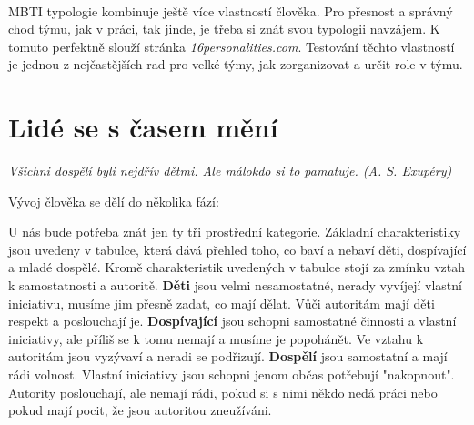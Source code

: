 \documentclass[a4paper,12pt]{report}
\begin{document}
\

MBTI typologie kombinuje ještě více vlastností člověka. Pro přesnost a správný chod týmu, jak v práci, tak jinde, je třeba si znát svou typologii navzájem. K tomuto perfektně slouží stránka \textit{16personalities.com}. Testování těchto vlastností je jednou z nejčastějších rad pro velké týmy, jak zorganizovat a určit role v týmu.

\section[Lidé se s časem mění]{Lidé se s časem mění}
\pagelogos
\textit{Všichni dospělí byli nejdřív dětmi. Ale málokdo si to pamatuje. (A. S. Exupéry)}

\begin{samepage}
Vývoj člověka se dělí do několika fází:
\end{samepage}

U nás bude potřeba znát jen ty tři prostřední kategorie. Základní charakteristiky jsou uvedeny v tabulce, která dává přehled toho, co baví a nebaví děti, dospívající a mladé dospělé. Kromě charakteristik uvedených v tabulce stojí za zmínku vztah k samostatnosti a autoritě. \textbf{Děti} jsou velmi nesamostatné, nerady vyvíjejí vlastní iniciativu, musíme jim přesně zadat, co mají dělat. Vůči autoritám mají děti respekt a poslouchají je. \textbf{Dospívající} jsou schopni samostatné činnosti a vlastní iniciativy, ale příliš se k tomu nemají a musíme je popohánět. Ve vztahu k autoritám jsou vyzývaví a neradi se podřizují. \textbf{Dospělí} jsou samostatní a mají rádi volnost. Vlastní iniciativy jsou schopni jenom občas potřebují "nakopnout". Autority poslouchají, ale nemají rádi, pokud si s nimi někdo nedá práci nebo pokud mají pocit, že jsou autoritou zneužíváni.
\end{document}
